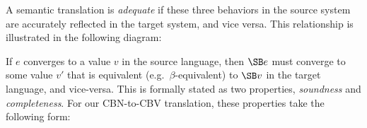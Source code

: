 A semantic translation is \emph{adequate} if these three behaviors in the source system are accurately reflected in the target system, and vice versa. This relationship is illustrated in the following diagram:
\begin{center}
\end{center}
If $e$ converges to a value $v$ in the source language, then $\SB e$ must converge to some value $v'$ that is equivalent (e.g.~$\beta$-equivalent) to $\SB v$ in the target language, and vice-versa. This is formally stated as two properties, \emph{soundness} and \emph{completeness}. For our CBN-to-CBV translation, these properties take the following form:

